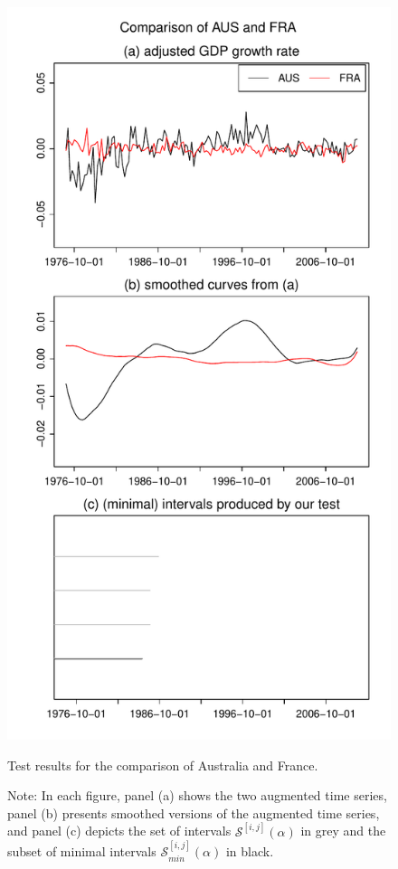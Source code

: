 \documentclass[12pt]{article}
\begin{document}
\begin{figure}
\begin{minipage}[t]{0.24\textwidth}
\includegraphics[width=\textwidth]{output/plots/gdp/AUS_vs_FRA}
\caption{Test results for the comparison of Australia and France.}\label{fig:Australia:France}
\end{minipage}
\caption*{Note: In each figure, panel (a) shows the two augmented time series, panel (b) presents smoothed versions of the augmented time series, and panel (c) depicts the set of intervals $\mathcal{S}^{[i, j]}(\alpha)$ in grey and the subset of minimal intervals $\mathcal{S}^{[i, j]}_{min}(\alpha)$ in black.}
\end{figure}
\end{document}
